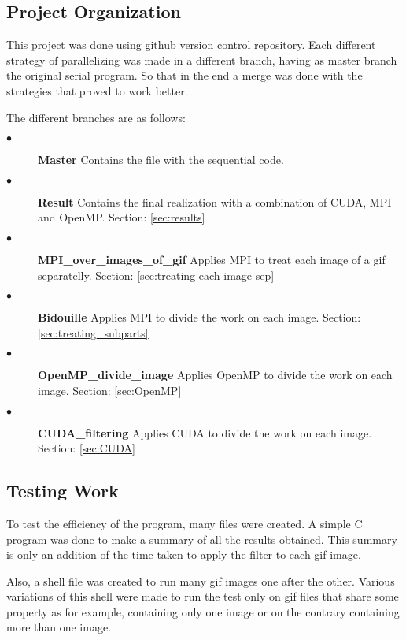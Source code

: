 \documentclass[conference,compsoc]{IEEEtran}
\begin{document}
\subsection{Project Organization} \label{sec:project-organization}
This project was done using github version control repository. Each different strategy of parallelizing was made in a different branch, having as master branch the original serial program. So that in the end a merge was done with the strategies that proved to work better.

The different branches are as follows:
\begin{description}
	\item[$\bullet$] \textbf{Master} Contains the file with the sequential code.
	\item[$\bullet$] \textbf{Result} Contains the final realization with a combination of CUDA, MPI and OpenMP. Section: \ref{sec:results}
	\item[$\bullet$] \textbf{MPI\_over\_images\_of\_gif} Applies MPI to treat each image of a gif separatelly. Section: \ref{sec:treating-each-image-sep}
	\item[$\bullet$] \textbf{Bidouille} Applies MPI to divide the work on each image. Section: \ref{sec:treating_subparts}
	\item[$\bullet$] \textbf{OpenMP\_divide\_image} Applies OpenMP to divide the work on each image. Section: \ref{sec:OpenMP}
	\item[$\bullet$] \textbf{CUDA\_filtering} Applies CUDA to divide the work on each image. Section: \ref{sec:CUDA}
\end{description}


\subsection{Testing Work}
To test the efficiency of the program, many files were created. A simple C program was done to make a summary of all the results obtained. This summary is only an addition of the time taken to apply the filter to each gif image.


Also, a shell file was created to run many gif images one after the other. Various variations of this shell were made to run the test only on gif files that share some property as for example, containing only one image or on the contrary containing more than one image.
\end{document}
